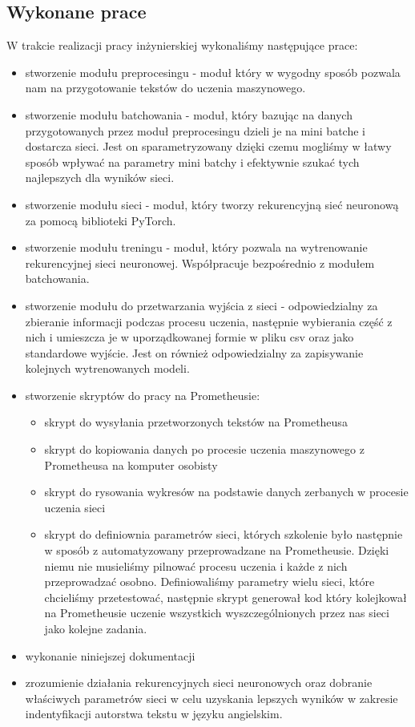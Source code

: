 \subsection{Wykonane prace}
W trakcie realizacji pracy inżynierskiej wykonaliśmy następujące prace:
\begin{itemize}
  \item stworzenie modułu preprocesingu - moduł który w wygodny sposób pozwala nam na przygotowanie tekstów 
  do uczenia maszynowego. 
  \item stworzenie modułu batchowania - moduł, który bazując na danych przygotowanych przez moduł 
  preprocesingu dzieli je na mini batche i dostarcza sieci. Jest on sparametryzowany dzięki czemu mogliśmy
  w łatwy sposób wpływać na parametry mini batchy i efektywnie szukać tych najlepszych dla wyników sieci. 
  \item stworzenie modułu sieci - moduł, który tworzy rekurencyjną sieć neuronową za pomocą
  biblioteki PyTorch.
  \item stworzenie modułu treningu - moduł, który pozwala na wytrenowanie rekurencyjnej sieci neuronowej. 
  Współpracuje bezpośrednio z modułem batchowania.
  \item stworzenie modułu do przetwarzania wyjścia z sieci - odpowiedzialny za zbieranie informacji podczas procesu uczenia,
  następnie wybierania część z nich i umieszcza je w uporządkowanej formie w pliku csv oraz 
  jako standardowe wyjście. Jest on również odpowiedzialny za zapisywanie kolejnych wytrenowanych modeli. 
  \item stworzenie skryptów do pracy na Prometheusie:
  \begin{itemize}
    \item skrypt do wysyłania przetworzonych tekstów na Prometheusa 
    \item skrypt do kopiowania danych po procesie uczenia maszynowego z Prometheusa na komputer osobisty
    \item skrypt do rysowania wykresów na podstawie danych zerbanych w procesie uczenia sieci
    \item skrypt do definiownia parametrów sieci, których szkolenie było następnie w sposób z
    automatyzowany przeprowadzane na Prometheusie. Dzięki niemu nie musieliśmy pilnować procesu uczenia i 
   	każde z nich przeprowadzać osobno. Definiowaliśmy parametry wielu sieci, które chcieliśmy przetestować,
   	następnie skrypt generował kod który kolejkował na Prometheusie uczenie wszystkich wyszczególnionych przez nas sieci 
   	jako kolejne zadania.
  \end{itemize}
  \item wykonanie niniejszej dokumentacji
  \item zrozumienie działania rekurencyjnych sieci neuronowych oraz dobranie właściwych parametrów sieci 
  w celu uzyskania lepszych wyników w zakresie indentyfikacji autorstwa tekstu w języku angielskim.
\end{itemize}


